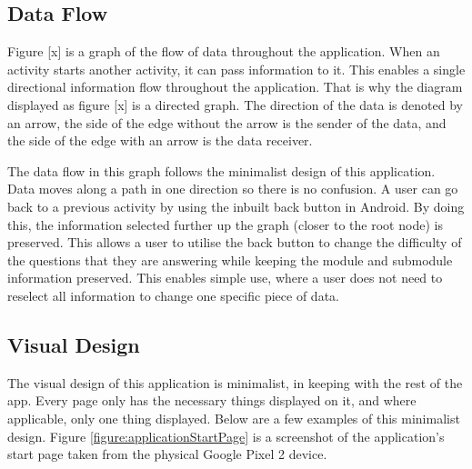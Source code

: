 \documentclass{article}
\begin{document}

\subsection{Data Flow}

Figure [x] is a graph of the flow of data throughout the application. When an activity starts another activity, it can pass information to it. This enables a single directional information flow throughout the application. That is why the diagram displayed as figure [x] is a directed graph. The direction of the data is denoted by an arrow, the side of the edge without the arrow is the sender of the data, and the side of the edge with an arrow is the data receiver. 


The data flow in this graph follows the minimalist design of this application. Data moves along a path in one direction so there is no confusion. A user can go back to a previous activity by using the inbuilt back button in Android. By doing this, the information selected further up the graph (closer to the root node) is preserved. This allows a user to utilise the back button to change the difficulty of the questions that they are answering while keeping the module and submodule information preserved. This enables simple use, where a user does not need to reselect all information to change one specific piece of data. \\

\subsection{Visual Design}

The visual design of this application is minimalist, in keeping with the rest of the app. Every page only has the necessary things displayed on it, and where applicable, only one thing displayed. Below are a few examples of this minimalist design. Figure \ref{figure:applicationStartPage} is a screenshot of the application's start page taken from the physical Google Pixel 2 device.
\end{document}
